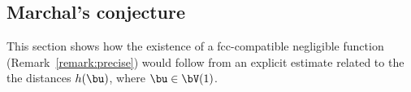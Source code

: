%
%
%
%
%
%
%








\subsection{Marchal's conjecture}

This section shows how the existence of a fcc-compatible negligible
function (Remark~\ref{remark:precise})  would follow from an explicit
estimate related to the the distances $h(\bu)$, where $\bu\in \bV(1)$.

